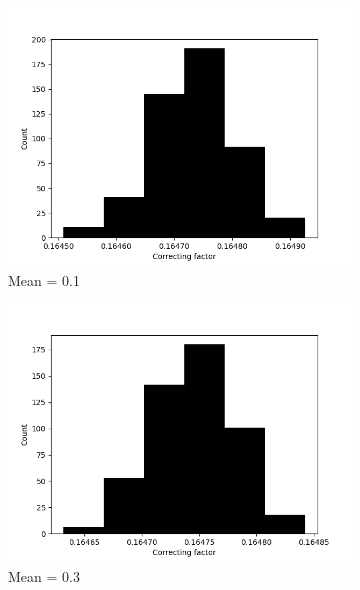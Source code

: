 \begin{figure}[!htbp]
  \begin{subfigure}[t]{0.45\textwidth}
    \centering
    \includegraphics[width=1\textwidth]{./images/robust_approx/correcting_factors_hadamard_std_10_01.png}
    \caption{Mean = 0.1}
  \end{subfigure}
  \begin{subfigure}[t]{0.45\textwidth}
    \centering
    \includegraphics[width=1\textwidth]{./images/robust_approx/correcting_factors_hadamard_std_10_03.png}
    \caption{Mean = 0.3}
  \end{subfigure}
  \begin{subfigure}[t]{0.45\textwidth}
    \centering

\end{subfigure}
\end{figure}
